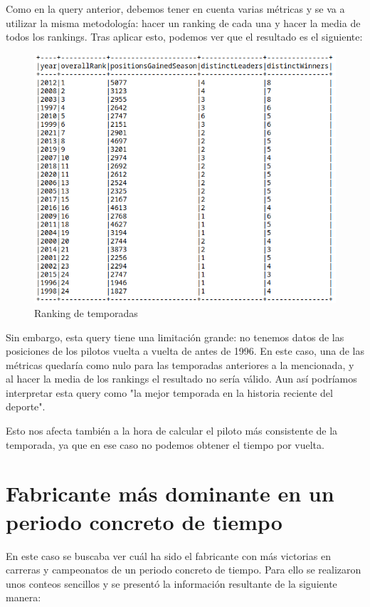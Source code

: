 \documentclass[12pt,twoside,titlepage]{report}
\begin{document}
Como en la query anterior, debemos tener en cuenta varias métricas y se va a utilizar la misma metodología: hacer un ranking de cada una y hacer la media de todos los rankings. Tras aplicar esto, podemos ver que el resultado es el siguiente:

\begin{figure}[H]
	\includegraphics[scale=0.4]{results/bestseason/bestseasonstats.png}
	\centering
	\caption{Ranking de temporadas}
	\label{fig:bestseason}
	\centering
\end{figure}

Sin embargo, esta query tiene una limitación grande: no tenemos datos de las posiciones de los pilotos vuelta a vuelta de antes de 1996. En este caso, una de las métricas quedaría como nulo para las temporadas anteriores a la mencionada, y al hacer la media de los rankings el resultado no sería válido. Aun así podríamos interpretar esta query como "la mejor temporada en la historia reciente del deporte".

Esto nos afecta también a la hora de calcular el piloto más consistente de la temporada, ya que en ese caso no podemos obtener el tiempo por vuelta.

\section{Fabricante más dominante en un periodo concreto de tiempo}

En este caso se buscaba ver cuál ha sido el fabricante con más victorias en carreras y campeonatos de un periodo concreto de tiempo. Para ello se realizaron unos conteos sencillos y se presentó la información resultante de la siguiente manera:
\end{document}
